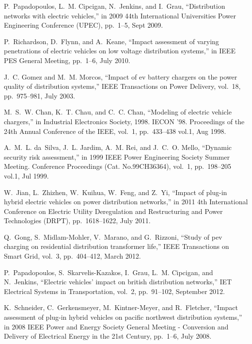P.~Papadopoulos, L.~M. Cipcigan, N.~Jenkins, and I.~Grau, ``Distribution
  networks with electric vehicles,'' in 2009 44th International
  Universities Power Engineering Conference (UPEC), pp.~1--5, Sept 2009.

P.~Richardson, D.~Flynn, and A.~Keane, ``Impact assessment of varying
  penetrations of electric vehicles on low voltage distribution systems,'' in
  IEEE PES General Meeting, pp.~1--6, July 2010.

J.~C. Gomez and M.~M. Morcos, ``Impact of ev battery chargers on the power
  quality of distribution systems,'' IEEE Transactions on Power Delivery,
  vol.~18, pp.~975--981, July 2003.

M.~S.~W. Chan, K.~T. Chau, and C.~C. Chan, ``Modeling of electric vehicle
  chargers,'' in Industrial Electronics Society, 1998. IECON '98.
  Proceedings of the 24th Annual Conference of the IEEE, vol.~1, pp.~433--438
  vol.1, Aug 1998.

A.~M.~L. da~Silva, J.~L. Jardim, A.~M. Rei, and J.~C.~O. Mello, ``Dynamic
  security risk assessment,'' in 1999 IEEE Power Engineering Society
  Summer Meeting. Conference Proceedings (Cat. No.99CH36364), vol.~1,
  pp.~198--205 vol.1, Jul 1999.

W.~Jian, L.~Zhizhen, W.~Kuihua, W.~Feng, and Z.~Yi, ``Impact of plug-in hybrid
  electric vehicles on power distribution networks,'' in 2011 4th
  International Conference on Electric Utility Deregulation and Restructuring
  and Power Technologies (DRPT), pp.~1618--1622, July 2011.

Q.~Gong, S.~Midlam-Mohler, V.~Marano, and G.~Rizzoni, ``Study of pev charging
  on residential distribution transformer life,'' IEEE Transactions on
  Smart Grid, vol.~3, pp.~404--412, March 2012.

P.~Papadopoulos, S.~Skarvelis-Kazakos, I.~Grau, L.~M. Cipcigan, and N.~Jenkins,
  ``Electric vehicles' impact on british distribution networks,'' IET
  Electrical Systems in Transportation, vol.~2, pp.~91--102, September 2012.

K.~Schneider, C.~Gerkensmeyer, M.~Kintner-Meyer, and R.~Fletcher, ``Impact
  assessment of plug-in hybrid vehicles on pacific northwest distribution
  systems,'' in 2008 IEEE Power and Energy Society General Meeting -
  Conversion and Delivery of Electrical Energy in the 21st Century, pp.~1--6,
  July 2008.

